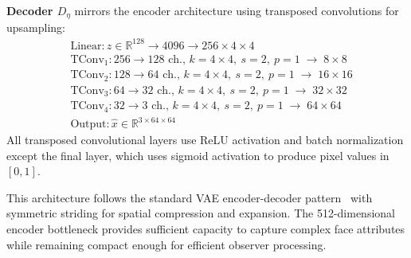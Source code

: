 \documentclass[10pt,twocolumn,letterpaper]{article}
\begin{document}
\textbf{Decoder $D_\eta$} mirrors the encoder architecture using transposed convolutions for upsampling:
{\small
\begin{align}
&\text{Linear}: z \in \mathbb{R}^{128} \to 4096 \to 256{\times}4{\times}4 \nonumber \\
&\text{TConv}_1: 256 \to 128 \text{ ch., } k{=}4{\times}4,\ s{=}2,\ p{=}1 \;\to\; 8{\times}8 \nonumber \\
&\text{TConv}_2: 128 \to 64 \text{ ch., } k{=}4{\times}4,\ s{=}2,\ p{=}1 \;\to\; 16{\times}16 \nonumber \\
&\text{TConv}_3: 64 \to 32 \text{ ch., } k{=}4{\times}4,\ s{=}2,\ p{=}1 \;\to\; 32{\times}32 \nonumber \\
&\text{TConv}_4: 32 \to 3 \text{ ch., } k{=}4{\times}4,\ s{=}2,\ p{=}1 \;\to\; 64{\times}64 \nonumber \\
&\text{Output}: \hat{x} \in \mathbb{R}^{3 \times 64 \times 64} \nonumber
\end{align}
}
All transposed convolutional layers use ReLU activation and batch normalization except the final layer, which uses sigmoid activation to produce pixel values in $[0, 1]$.

This architecture follows the standard VAE encoder-decoder pattern~\cite{kingma2013auto} with symmetric striding for spatial compression and expansion. The 512-dimensional encoder bottleneck provides sufficient capacity to capture complex face attributes while remaining compact enough for efficient observer processing.
\end{document}
